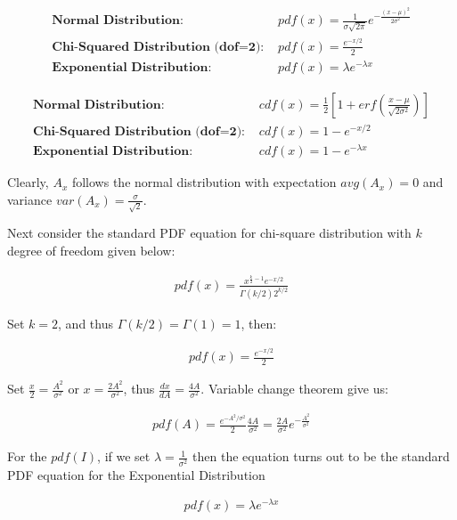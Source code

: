 \begin{align}
\textbf{Normal Distribution: } & pdf(x) = \frac{1}{\sigma \sqrt{2\pi}} e^{- \frac{(x-\mu)^2}{2 \sigma^2}} \\
\textbf{Chi-Squared Distribution (dof=2): } & pdf(x) = \frac{e^{-x/2}}{2} \\ %
\textbf{Exponential Distribution: } & pdf(x) = \lambda e^{- \lambda x}
\end{align}

\begin{align}
\textbf{Normal Distribution: } & cdf(x) = \frac{1}{2} \left[ 1 + erf \left( \frac{x-\mu}{\sqrt{2\sigma^2}} \right) \right] \\
\textbf{Chi-Squared Distribution (dof=2): } & cdf(x) = 1 - e^{-x/2}\\
\textbf{Exponential Distribution: } & cdf(x) = 1 - e^{- \lambda x}
\end{align}

Clearly, $A_x$ follows the normal distribution with expectation $avg(A_x)=0$ and variance $var(A_x)=\frac{\sigma}{\sqrt{2}}$.

Next consider the standard PDF equation for chi-square distribution with $k$ degree of freedom given below:

\begin{align}
pdf(x) = \frac{x^{\frac{k}{2}-1}e^{-x/2}}{\Gamma(k/2)2^{k/2}}
\end{align}

Set $k=2$, and thus $\Gamma(k/2)=\Gamma(1)=1$, then:

\begin{align}
pdf(x) = \frac{e^{-x/2}}{2} 
\end{align}

Set $\frac{x}{2} = \frac{A^2}{\sigma^2}$ or $x = \frac{2A^2}{\sigma^2}$, thus $\frac{dx}{dA} = \frac{4A}{\sigma^2}$.
Variable change theorem give us:

\begin{align}
pdf(A) = \frac{e^{-A^2/\sigma^2}}{2} \frac{4A}{\sigma^2} = \frac{2A}{\sigma^2} e^{-\frac{A^2}{\sigma^2}}
\end{align}


For the $pdf(I)$, if we set $\lambda = \frac{1}{\sigma^2}$ then the equation turns out to be the standard PDF equation for the Exponential Distribution 

\begin{align}
pdf(x) = \lambda e^{- \lambda x}
\end{align}
